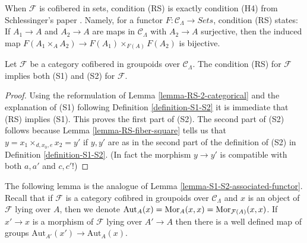 \begin{remark}
\label{remark-compare-schlessinger-H4}
When $\mathcal{F}$ is cofibered in sets, condition (RS) is exactly condition
(H4) from Schlessinger's paper \cite[Theorem 2.11]{Sch}.  Namely, for
a functor $F: \mathcal{C}_\Lambda \to \textit{Sets}$, condition
(RS) states: If $A_1 \to A$ and $A_2 \to A$ are maps in
$\mathcal{C}_\Lambda$ with $A_2 \to A$ surjective, then the induced
map $F(A_1 \times_A A_2) \to F(A_1) \times_{F(A)} F(A_2)$ is
bijective.
\end{remark}

\begin{lemma}
\label{lemma-RS-implies-S1-S2}
Let $\mathcal{F}$ be a category cofibered in groupoids over
$\mathcal{C}_\Lambda$. The condition (RS) for $\mathcal{F}$
implies both (S1) and (S2) for $\mathcal{F}$.
\end{lemma}

\begin{proof}
Using the reformulation of
Lemma \ref{lemma-RS-2-categorical}
and the explanation of (S1) following
Definition \ref{definition-S1-S2}
it is immediate that (RS) implies (S1).
This proves the first part of (S2). The second part of (S2)
follows because
Lemma \ref{lemma-RS-fiber-square}
tells us that $y = x_1 \times_{d, x_0, e} x_2 = y'$ if
$y, y'$ are as in the second part of the definition of (S2) in
Definition \ref{definition-S1-S2}. (In fact the morphism
$y \to y'$ is compatible with both $a, a'$ and $c, c'$!)
\end{proof}

\noindent
The following lemma is the analogue of
Lemma \ref{lemma-S1-S2-associated-functor}.
Recall that if $\mathcal{F}$ is a category cofibred in groupoids over
$\mathcal{C}_\Lambda$ and $x$ is an object of $\mathcal{F}$
lying over $A$, then we denote
$\text{Aut}_A(x) = \mathop{\rm Mor}\nolimits_A(x, x) = \mathop{\rm Mor}\nolimits_{\mathcal{F}(A)}(x, x)$.
If $x' \to x$ is a morphism of $\mathcal{F}$ lying over $A' \to A$
then there is a well defined map of groups
$\text{Aut}_{A'}(x') \to \text{Aut}_A(x)$.

